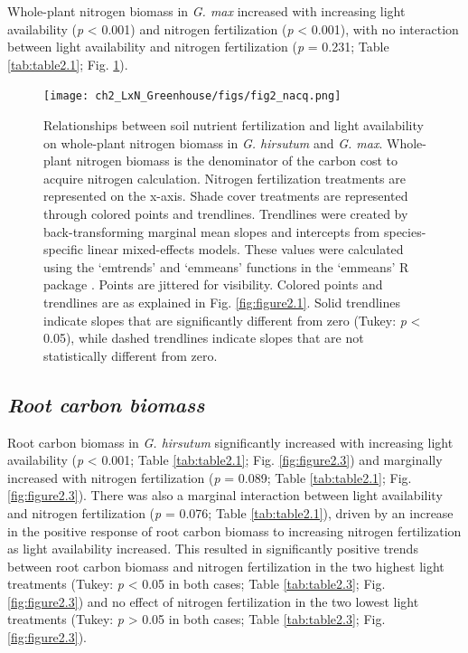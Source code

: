 Whole-plant nitrogen biomass in \textit{G. max} increased with increasing light availability (\textit{p} < 0.001) and nitrogen fertilization (\textit{p} < 0.001), with no interaction between light availability and nitrogen fertilization (\textit{p} = 0.231; Table \ref{tab:table2.1}; Fig. \ref{fig:figure2.2}).

\newpage
\begin{landscape}
\begin{figure}
    \texttt{[image: ch2\_LxN\_Greenhouse/figs/fig2\_nacq.png]}
    \centering
    \caption[Relationships between soil nitrogen fertilization and light availability on whole-plant nitrogen biomass in \textit{G. hirsutum} and \textit{G. max}]{Relationships between soil nutrient fertilization and light availability on whole-plant nitrogen biomass in \textit{G. hirsutum} and \textit{G. max}. Whole-plant nitrogen biomass is the denominator of the carbon cost to acquire nitrogen calculation. Nitrogen fertilization treatments are represented on the x-axis. Shade cover treatments are represented through colored points and trendlines. Trendlines were created by back-transforming marginal mean slopes and intercepts from species-specific linear mixed-effects models. These values were calculated using the ‘emtrends’ and ‘emmeans’ functions in the ‘emmeans’ R package . Points are jittered for visibility. Colored points and trendlines are as explained in Fig. \ref{fig:figure2.1}. Solid trendlines indicate slopes that are significantly different from zero (Tukey: \textit{p} < 0.05), while dashed trendlines indicate slopes that are not statistically different from zero.}
    \label{fig:figure2.2}
    \small
\end{figure}
\end{landscape}
\clearpage

\newpage
\subsection{\textit{Root carbon biomass}}
Root carbon biomass in \textit{G. hirsutum} significantly increased with increasing light availability (\textit{p} < 0.001; Table \ref{tab:table2.1}; Fig. \ref{fig:figure2.3}) and marginally increased with nitrogen fertilization (\textit{p} = 0.089; Table \ref{tab:table2.1}; Fig. \ref{fig:figure2.3}). There was also a marginal interaction between light availability and nitrogen fertilization (\textit{p} = 0.076; Table \ref{tab:table2.1}), driven by an increase in the positive response of root carbon biomass to increasing nitrogen fertilization as light availability increased. This resulted in significantly positive trends between root carbon biomass and nitrogen fertilization in the two highest light treatments (Tukey: \textit{p} < 0.05 in both cases; Table \ref{tab:table2.3}; Fig. \ref{fig:figure2.3}) and no effect of nitrogen fertilization in the two lowest light treatments (Tukey: \textit{p} > 0.05 in both cases; Table \ref{tab:table2.3}; Fig. \ref{fig:figure2.3}). 

